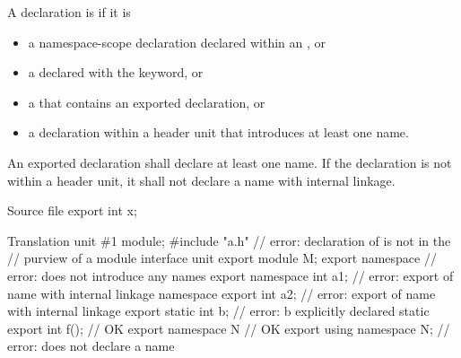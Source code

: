 \pnum
A declaration is  if it is
\begin{itemize}
\item a namespace-scope declaration declared within an
      , or
\item a  declared with
      the  keyword, or
\item a  that contains an
      exported declaration, or
\item a declaration within a header unit
      that introduces at least one name.
\end{itemize}

\pnum
An exported declaration shall declare at least one name.
If the declaration is not within a header unit,
it shall not declare a name with internal linkage.

\pnum
\begin{example}
\begin{codeblocktu}{Source file }
export int x;
\end{codeblocktu}

\begin{codeblocktu}{Translation unit \#1}
module;
#include "a.h"                  // error: declaration of  is not in the
                                // purview of a module interface unit
export module M;
export namespace {}             // error: does not introduce any names
export namespace {
  int a1;                       // error: export of name with internal linkage
}
namespace {
  export int a2;                // error: export of name with internal linkage
}
export static int b;            // error: b explicitly declared static
export int f();                 // OK
export namespace N { }          // OK
export using namespace N;       // error: does not declare a name
\end{codeblocktu}
\end{example}

